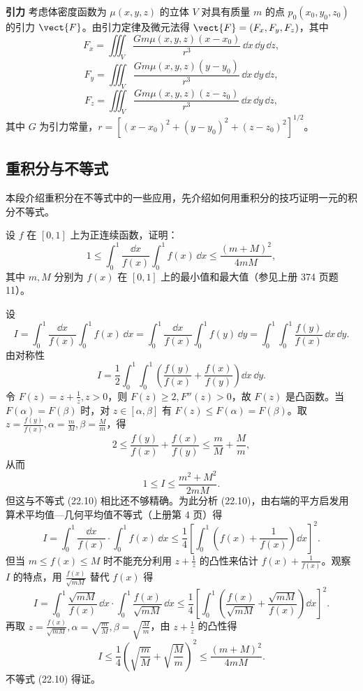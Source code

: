 \textbf{引力}
考虑体密度函数为 $\mu(x,y,z)$ 的立体 $V$ 对具有质量 $m$ 的点 $p_0(x_0,y_0,z_0)$ 的引力 $\vect{F}$。由引力定律及微元法得 $\vect{F}=(F_x,F_y,F_z)$，其中
\[
  F_x=\iiint_V\frac{Gm\mu(x,y,z)(x-x_0)}{r^3}\,\dd x\,\dd y\,\dd z,
\]
\[
  F_y=\iiint_V\frac{Gm\mu(x,y,z)(y-y_0)}{r^3}\,\dd x\,\dd y\,\dd z,
\]
\[
  F_z=\iiint_V\frac{Gm\mu(x,y,z)(z-z_0)}{r^3}\,\dd x\,\dd y\,\dd z,
\]
其中 $G$ 为引力常量，$r=[(x-x_0)^2+(y-y_0)^2+(z-z_0)^2]^{1/2}$。

\subsection{重积分与不等式}

本段介绍重积分在不等式中的一些应用，先介绍如何用重积分的技巧证明一元的积分不等式。

\begin{xexample}[22.5.5]
设 $f$ 在 $[0,1]$ 上为正连续函数，证明：
\begin{equation}
  1\le\int_0^1\frac{\dd x}{f(x)}\int_0^1f(x)\,\dd x
  \le\frac{(m+M)^2}{4mM},
  \tag{22.10}
  \label{eq:22.10}
\end{equation}
其中 $m,M$ 分别为 $f(x)$ 在 $[0,1]$ 上的最小值和最大值（参见上册 374 页题 11）。
\end{xexample}
\begin{xproof}
设
\[
  I=\int_0^1\frac{\dd x}{f(x)}\int_0^1f(x)\,\dd x
  =\int_0^1\frac{\dd x}{f(x)}\int_0^1f(y)\,\dd y
  =\int_0^1\int_0^1\frac{f(y)}{f(x)}\,\dd x\,\dd y.
\]
由对称性
\[
  I=\frac12\int_0^1\int_0^1\left(\frac{f(y)}{f(x)}+\frac{f(x)}{f(y)}\right)\dd x\,\dd y.
\]
令 $F(z)=z+\frac1z,z>0$，则 $F(z)\ge2,F''(z)>0$，故 $F(z)$ 是凸函数。当 $F(\alpha)=F(\beta)$ 时，对 $z\in[\alpha,\beta]$ 有 $F(z)\le F(\alpha)=F(\beta)$。取 $z=\frac{f(y)}{f(x)},\alpha=\frac mM,\beta=\frac Mm$，得
\[
  2\le\frac{f(y)}{f(x)}+\frac{f(x)}{f(y)}\le\frac mM+\frac Mm,
\]
从而
\[
  1\le I\le\frac{m^2+M^2}{2mM}.
\]
但这与不等式 (22.10) 相比还不够精确。为此分析 (22.10)，由右端的平方启发用算术平均值—几何平均值不等式（上册第 4 页）得
\begin{equation}
  I=\int_0^1\frac{\dd x}{f(x)}\cdot\int_0^1f(x)\,\dd x
  \le\frac14\left[\int_0^1\left(f(x)+\frac1{f(x)}\right)\dd x\right]^2.
  \tag{22.11}
  \label{eq:22.11}
\end{equation}
但当 $m\le f(x)\le M$ 时不能充分利用 $z+\frac1z$ 的凸性来估计 $f(x)+\frac1{f(x)}$。观察 $I$ 的特点，用 $\frac{f(x)}{\sqrt{mM}}$ 替代 $f(x)$ 得
\[
  I=\int_0^1\frac{\sqrt{mM}}{f(x)}\,\dd x\cdot\int_0^1\frac{f(x)}{\sqrt{mM}}\,\dd x
  \le\frac14\left[\int_0^1\left(\frac{f(x)}{\sqrt{mM}}+\frac{\sqrt{mM}}{f(x)}\right)\dd x\right]^2.
\]
再取 $z=\frac{f(x)}{\sqrt{mM}},\alpha=\sqrt{\frac mM},\beta=\sqrt{\frac Mm}$，由 $z+\frac1z$ 的凸性得
\[
  I\le\frac14\left(\sqrt{\frac mM}+\sqrt{\frac Mm}\right)^2
  \le\frac{(m+M)^2}{4mM}.
\]
不等式 (22.10) 得证。
\end{xproof}

